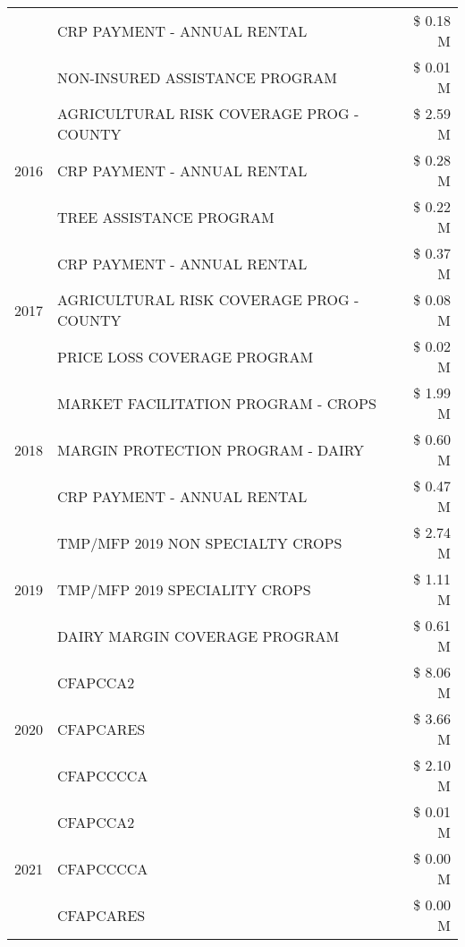 \begin{tabular}{llr}
 & CRP PAYMENT - ANNUAL RENTAL & \$ 0.18 M \\
 & NON-INSURED ASSISTANCE PROGRAM & \$ 0.01 M \\
\cline{1-3}
\multirow[t]{3}{*}{2016} & AGRICULTURAL RISK COVERAGE PROG - COUNTY & \$ 2.59 M \\
 & CRP PAYMENT - ANNUAL RENTAL & \$ 0.28 M \\
 & TREE ASSISTANCE PROGRAM & \$ 0.22 M \\
\cline{1-3}
\multirow[t]{3}{*}{2017} & CRP PAYMENT - ANNUAL RENTAL & \$ 0.37 M \\
 & AGRICULTURAL RISK COVERAGE PROG - COUNTY & \$ 0.08 M \\
 & PRICE LOSS COVERAGE PROGRAM & \$ 0.02 M \\
\cline{1-3}
\multirow[t]{3}{*}{2018} & MARKET FACILITATION PROGRAM - CROPS & \$ 1.99 M \\
 & MARGIN PROTECTION PROGRAM - DAIRY & \$ 0.60 M \\
 & CRP PAYMENT - ANNUAL RENTAL & \$ 0.47 M \\
\cline{1-3}
\multirow[t]{3}{*}{2019} & TMP/MFP 2019 NON SPECIALTY CROPS & \$ 2.74 M \\
 & TMP/MFP 2019 SPECIALITY CROPS & \$ 1.11 M \\
 & DAIRY MARGIN COVERAGE PROGRAM & \$ 0.61 M \\
\cline{1-3}
\multirow[t]{3}{*}{2020} & CFAPCCA2 & \$ 8.06 M \\
 & CFAPCARES & \$ 3.66 M \\
 & CFAPCCCCA & \$ 2.10 M \\
\cline{1-3}
\multirow[t]{3}{*}{2021} & CFAPCCA2 & \$ 0.01 M \\
 & CFAPCCCCA & \$ 0.00 M \\
 & CFAPCARES & \$ 0.00 M \\
\cline{1-3}
\bottomrule
\end{tabular}
